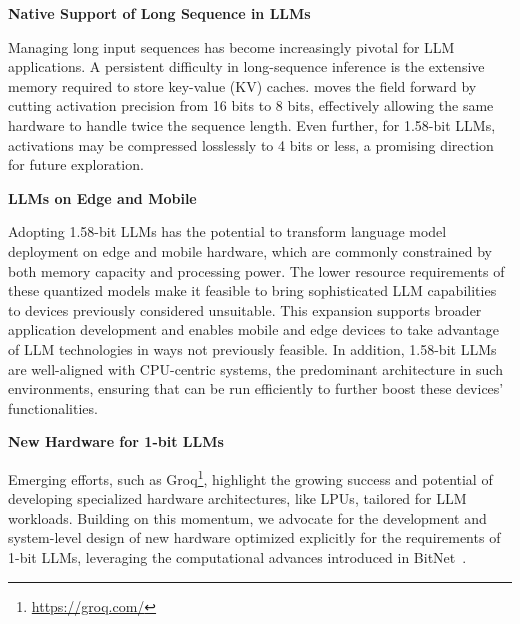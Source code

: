 \textbf{Native Support of Long Sequence in LLMs}

Managing long input sequences has become increasingly pivotal for LLM applications. A persistent difficulty in long-sequence inference is the extensive memory required to store key-value (KV) caches.  moves the field forward by cutting activation precision from 16 bits to 8 bits, effectively allowing the same hardware to handle twice the sequence length. Even further, for 1.58-bit LLMs, activations may be compressed losslessly to 4 bits or less, a promising direction for future exploration.

\textbf{LLMs on Edge and Mobile}

Adopting 1.58-bit LLMs has the potential to transform language model deployment on edge and mobile hardware, which are commonly constrained by both memory capacity and processing power. The lower resource requirements of these quantized models make it feasible to bring sophisticated LLM capabilities to devices previously considered unsuitable. This expansion supports broader application development and enables mobile and edge devices to take advantage of LLM technologies in ways not previously feasible. In addition, 1.58-bit LLMs are well-aligned with CPU-centric systems, the predominant architecture in such environments, ensuring that  can be run efficiently to further boost these devices’ functionalities.

\textbf{New Hardware for 1-bit LLMs}

Emerging efforts, such as Groq\footnote{\url{https://groq.com/}}, highlight the growing success and potential of developing specialized hardware architectures, like LPUs, tailored for LLM workloads. Building on this momentum, we advocate for the development and system-level design of new hardware optimized explicitly for the requirements of 1-bit LLMs, leveraging the computational advances introduced in BitNet~\cite{bitnet}.